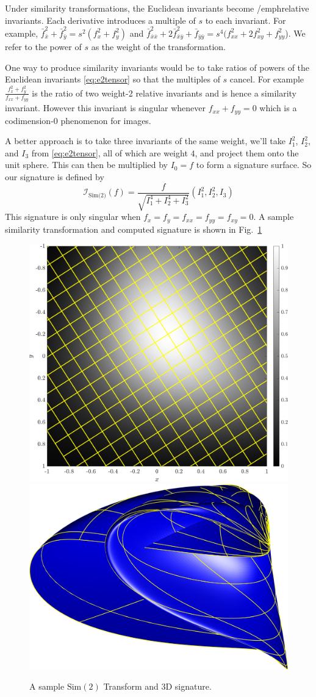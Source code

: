 \documentclass[review,onefignum,onetabnum]{siamonline190516}
\begin{document}
Under similarity transformations, the Euclidean invariants become
/emph{relative invariants}. Each derivative introduces a multiple of $s$ to
each invariant. For example, $\bar{f}_{\bar x}^2 + \bar{f}_{\bar y}^2 =
s^2(f_x^2 + f_y^2)$ and $\bar{f}_{\bar x \bar x}^2 + 2\bar{f}_{\bar x \bar
y}^2 + \bar{f}_{\bar y \bar y} = s^4 (f_{xx}^2 + 2f_{xy}^2 + f_{yy}^2$). We
refer to the power of $s$ as the weight of the transformation. 

One way to produce similarity invariants would be to take ratios of powers
of the Euclidean invariants \eqref{eq:e2tensor} so that the multiples of
$s$ cancel. For example $\frac{f_x^2 + f_y^2}{f_{xx} + f_{yy}}$ is the
ratio of two weight-2 relative invariants and is hence a similarity
invariant. However this invariant is singular whenever $f_{xx} + f_{yy} =
0$ which is a codimension-0 phenomenon for images. 

A better approach is to take three invariants of the same weight, we'll
take $I_1^2$, $I_2^2$, and $I_3$ from \eqref{eq:e2tensor}, all of which are
weight $4$, and project them onto the unit sphere. This can then be
multiplied by $I_0 = f$ to form a signature surface. So our signature is
defined by
\begin{equation}
    \label{eq:sim2signature}
\mathcal{I}_{\text{Sim(2)}}(f) = \frac{f}{\sqrt{I_1^4 + I_2^4 + I_3^2}}(I_1^2, I_2^2,
        I_3)
\end{equation}
This signature is only singular when $f_x = f_y = f_{xx} = f_{yy} = f_{xy}
= 0$. A sample similarity transformation and computed signature is shown in
Fig.~\ref{fig:Sim2}
\begin{figure}
\centering
\includegraphics[width=.45\textwidth]{Figs/f_transformed_Sim2.png}
\includegraphics[width=.45\textwidth]{Figs/Sim2_signature.png}
\caption{A sample $\text{Sim}(2)$ Transform and 3D signature.}
\label{fig:Sim2}
\end{figure}
\end{document}
